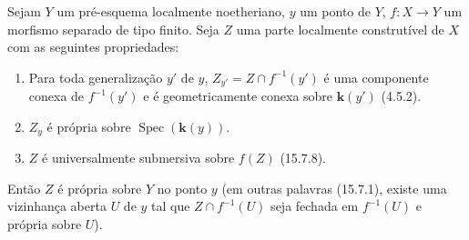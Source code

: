 \begin{proposition}[15.7.9]
\label{IV.15.7.9}
Sejam $Y$ um pré-esquema localmente noetheriano, $y$ um ponto de $Y$, $f:X\to Y$ um morfismo separado de tipo finito. Seja $Z$ uma parte localmente construtível de $X$ com as seguintes propriedades:
\begin{enumerate}
  \item[\rm (i)] Para toda generalização $y'$ de $y$, $Z_{y'}=Z\cap f^{-1}(y')$ é uma componente conexa de $f^{-1}(y')$ e é geometricamente conexa sobre $\mathbf k(y')$ (4.5.2).
  \item[\rm (ii)] $Z_y$ é própria sobre $\operatorname{Spec}(\mathbf k(y))$.
  \item[\rm (iii)] $Z$ é universalmente submersiva sobre $f(Z)$ (15.7.8).
\end{enumerate}
Então $Z$ é própria sobre $Y$ no ponto $y$ (em outras palavras (15.7.1), existe uma vizinhança aberta $U$ de $y$ tal que $Z\cap f^{-1}(U)$ seja fechada em $f^{-1}(U)$ e própria sobre $U$).
\end{proposition}

